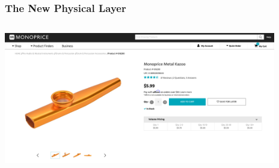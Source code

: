 \documentclass[
	11pt, %
]{beamer}
\begin{document}

\begin{frame}
  \frametitle{The New Physical Layer}

  \begin{columns}[c] %
    \begin{column}{0.7\textwidth} %
      \begin{center}
        \includegraphics[width=1\linewidth]{monoprice.png}
      \end{center}
    \end{column}
    \begin{column}{0.25\textwidth} %
      \begin{center}
        \begin{figure}

\end{figure}
\end{center}
\end{column}
\end{columns}
\end{frame}
\end{document}
